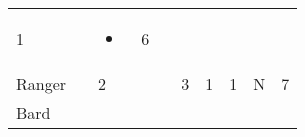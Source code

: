 \documentclass[12pt]{article}
\begin{document}
\begin{longtable}[]{@{}llllllllll@{}}
\begin{minipage}[t]{0.06\columnwidth}
1
\strut\end{minipage} &
\begin{minipage}[t]{0.06\columnwidth}\raggedright\strut
\strut\end{minipage} &
\begin{minipage}[t]{0.07\columnwidth}\raggedright\strut
\begin{itemize}
\item
\end{itemize}
\strut\end{minipage} &
\begin{minipage}[t]{0.08\columnwidth}\raggedright\strut
6
\strut\end{minipage}\tabularnewline
\begin{minipage}[t]{0.13\columnwidth}\raggedright\strut
Ranger
\strut\end{minipage} &
\begin{minipage}[t]{0.06\columnwidth}\raggedright\strut
\strut\end{minipage} &
\begin{minipage}[t]{0.06\columnwidth}\raggedright\strut
2
\strut\end{minipage} &
\begin{minipage}[t]{0.06\columnwidth}\raggedright\strut
\strut\end{minipage} &
\begin{minipage}[t]{0.06\columnwidth}\raggedright\strut
\strut\end{minipage} &
\begin{minipage}[t]{0.06\columnwidth}\raggedright\strut
3
\strut\end{minipage} &
\begin{minipage}[t]{0.06\columnwidth}\raggedright\strut
1
\strut\end{minipage} &
\begin{minipage}[t]{0.06\columnwidth}\raggedright\strut
1
\strut\end{minipage} &
\begin{minipage}[t]{0.07\columnwidth}\raggedright\strut
N
\strut\end{minipage} &
\begin{minipage}[t]{0.08\columnwidth}\raggedright\strut
7
\strut\end{minipage}\tabularnewline
\begin{minipage}[t]{0.13\columnwidth}\raggedright\strut
Bard
\strut\end{minipage} &
\begin{minipage}[t]{0.06\columnwidth}\raggedright\strut
\strut\end{minipage} &

\end{longtable}
\end{document}
